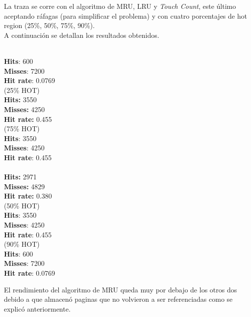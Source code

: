 \documentclass[11pt, a4paper, spanish]{article}
\begin{document}
La traza se corre con el algoritmo de MRU, LRU y \textit{Touch Count}, este \'ultimo aceptando r\'afagas (para simplificar el problema) y 
con cuatro porcentajes de hot region (25\%, 50\%, 75\%, 90\%).\\

A continuaci\'on se detallan los resultados obtenidos.\\

\newpage

\begin{multicols}{2}
\\
\textbf{Hits}: 600\\
\textbf{Misses}: 7200\\
\textbf{Hit rate}: 0.0769\\

 (25\% HOT)\\
\textbf{Hits:} 3550\\
\textbf{Misses:} 4250\\
\textbf{Hit rate:} 0.455\\

 (75\% HOT)\\
\textbf{Hits}: 3550\\
\textbf{Misses}: 4250\\
\textbf{Hit rate}: 0.455\\

\\
\textbf{Hits:} 2971\\
\textbf{Misses:} 4829\\
\textbf{Hit rate:} 0.380\\

 (50\% HOT)\\
\textbf{Hits}: 3550\\
\textbf{Misses}: 4250\\
\textbf{Hit rate}: 0.455\\

 (90\% HOT)\\
\textbf{Hits}: 600\\
\textbf{Misses}: 7200\\
\textbf{Hit rate}: 0.0769\\

\end{multicols}


El rendimiento del algoritmo de MRU queda muy por debajo de los otros dos debido a que almacen\'o paginas que no volvieron a ser referenciadas
 como se explic\'o anteriormente.\\
\end{document}
